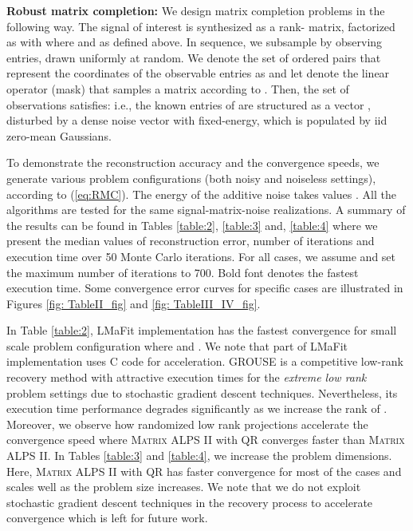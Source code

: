 \documentclass[twocolumn]{svjour3}
\begin{document}
\textbf{Robust matrix completion:} We design matrix completion problems in the following way. The signal of interest  is synthesized as a rank- matrix, factorized as  with  where  and  as defined above. In sequence, we subsample  by observing  entries, drawn uniformly at random. We denote the set of ordered pairs that represent the coordinates of the observable entries as  and let  denote the linear operator (mask) that samples a matrix according to . Then, the set of observations satisfies:
 i.e., the known entries of  are structured as a vector , disturbed by a dense noise vector  with fixed-energy, which is populated by iid zero-mean Gaussians. 

To demonstrate the reconstruction accuracy and the convergence speeds, we generate various problem configurations (both noisy and noiseless settings), according to (\ref{eq:RMC}). The energy of the additive noise takes values  . All the algorithms are tested for the same signal-matrix-noise realizations. A summary of the results can be found in Tables \ref{table:2}, \ref{table:3} and, \ref{table:4} where we present the median values of reconstruction error, number of iterations and execution time over 50 Monte Carlo iterations. For all cases, we assume  and set the maximum number of iterations to 700. Bold font denotes the fastest execution time. Some convergence error curves for specific cases are illustrated in Figures \ref{fig: TableII_fig} and \ref{fig: TableIII_IV_fig}.

In Table \ref{table:2}, LMaFit \cite{LMatFit} implementation has the fastest convergence for small scale problem configuration where  and . We note that part of LMaFit implementation uses C code for acceleration. GROUSE \cite{GROUSE} is a competitive low-rank recovery method with attractive execution times for the {\it extreme low rank} problem settings due to stochastic gradient descent techniques. Nevertheless, its execution time performance degrades significantly as we increase the rank of . Moreover, we observe how randomized low rank projections accelerate the convergence speed where \textsc{Matrix ALPS II} with QR converges faster than \textsc{Matrix ALPS II}. In Tables \ref{table:3} and \ref{table:4}, we increase the problem dimensions. Here, \textsc{Matrix ALPS II} with QR has faster convergence for most of the cases and scales well as the problem size increases. We note that we do not exploit stochastic gradient descent techniques in the recovery process to accelerate convergence which is left for future work.
\end{document}
